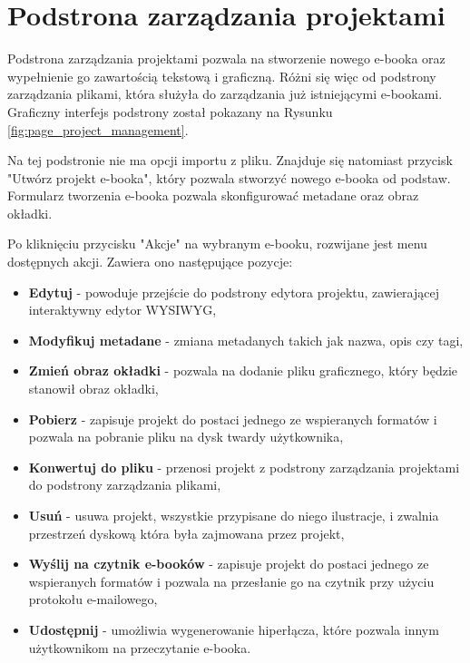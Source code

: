 \section{Podstrona zarządzania projektami}

Podstrona zarządzania projektami pozwala na stworzenie nowego e-booka oraz wypełnienie go zawartością tekstową i graficzną. Różni się więc od podstrony zarządzania plikami, która służyła do zarządzania już istniejącymi e-bookami. Graficzny interfejs podstrony został pokazany na Rysunku \ref{fig:page_project_management}.

Na tej podstronie nie ma opcji importu z pliku. Znajduje się natomiast przycisk "Utwórz projekt e-booka", który pozwala stworzyć nowego e-booka od podstaw. Formularz tworzenia e-booka pozwala skonfigurować metadane oraz obraz okładki.

Po kliknięciu przycisku "Akcje" na wybranym e-booku, rozwijane jest menu dostępnych akcji. Zawiera ono następujące pozycje:

\begin{itemize}
    \item \textbf{Edytuj} - powoduje przejście do podstrony edytora projektu, zawierającej interaktywny edytor WYSIWYG,
    \item \textbf{Modyfikuj metadane} - zmiana metadanych takich jak nazwa, opis czy tagi,
    \item \textbf{Zmień obraz okładki} - pozwala na dodanie pliku graficznego, który będzie stanowił obraz okładki,
    \item \textbf{Pobierz} - zapisuje projekt do postaci jednego ze wspieranych formatów i pozwala na pobranie pliku na dysk twardy użytkownika,
    \item \textbf{Konwertuj do pliku} - przenosi projekt z podstrony zarządzania projektami do podstrony zarządzania plikami,
    \item \textbf{Usuń} - usuwa projekt, wszystkie przypisane do niego ilustracje, i zwalnia przestrzeń dyskową która była zajmowana przez projekt, 
    \item \textbf{Wyślij na czytnik e-booków} - zapisuje projekt do postaci jednego ze wspieranych formatów i pozwala na przesłanie go na czytnik przy użyciu protokołu e-mailowego,
    \item \textbf{Udostępnij} - umożliwia wygenerowanie hiperłącza, które pozwala innym użytkownikom na przeczytanie e-booka.
\end{itemize}

